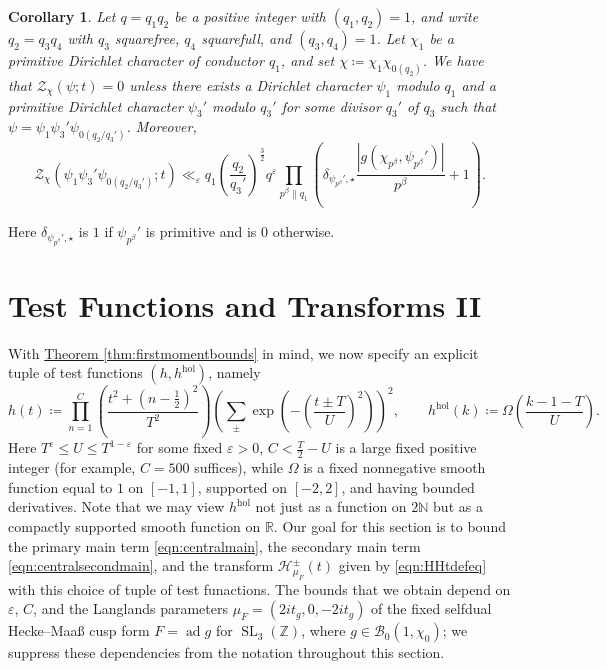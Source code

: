 \documentclass[11pt,a4paper]{amsart}
\newcommand{\BB}{\mathcal{B}}
\newcommand{\e}{\varepsilon}
\newcommand{\HH}{\mathcal{H}}
\newcommand{\hol}{\mathrm{hol}}
\newcommand{\N}{\mathbb{N}}
\newcommand{\R}{\mathbb{R}}
\newcommand{\Z}{\mathbb{Z}}
\newcommand{\ZZ}{\mathcal{Z}}
\DeclareMathOperator{\ad}{ad}
\DeclareMathOperator{\SL}{SL}
\numberwithin{equation}{section}
\newtheorem{corollary}[equation]{Corollary}
\theoremstyle{remark}
\theoremstyle{definition}
\begin{document}
\begin{corollary}
\label{cor:Zbounds}
Let $q = q_1 q_2$ be a positive integer with $(q_1,q_2) = 1$, and write $q_2 = q_3 q_4$ with $q_3$ squarefree, $q_4$ squarefull, and $(q_3,q_4) = 1$. Let $\chi_1$ be a primitive Dirichlet character of conductor $q_1$, and set $\chi \coloneqq \chi_1 \chi_{0(q_2)}$. We have that $\ZZ_{\chi}(\psi;t) = 0$ unless there exists a Dirichlet character $\psi_1$ modulo $q_1$ and a primitive Dirichlet character $\psi_3'$ modulo $q_3'$ for some divisor $q_3'$ of $q_3$ such that $\psi = \psi_1 \psi_3' \psi_{0(q_2/q_3')}$. Moreover,
\[\ZZ_{\chi}\left(\psi_1 \psi_3' \psi_{0(q_2/q_3')};t\right) \ll_{\varepsilon} q_1 \left(\frac{q_2}{q_3'}\right)^{\frac{3}{2}} q^{\e} \prod_{p^{\beta} \parallel q_1} \left(\delta_{\psi_{p^{\beta}}',\star} \frac{|g(\chi_{p^{\beta}},\psi_{p^{\beta}}')|}{p^{\beta}} + 1\right).\]
\end{corollary}

Here $\delta_{\psi_{p^{\beta}}',\star}$ is $1$ if $\psi_{p^{\beta}}'$ is primitive and is $0$ otherwise.


\section{Test Functions and Transforms II}
\label{sect:testfunctionsII}

With \hyperref[thm:firstmomentbounds]{Theorem \ref*{thm:firstmomentbounds}} in mind, we now specify an explicit tuple of test functions $(h,h^{\hol})$, namely
\begin{equation}
\label{eqn:testfunctionchoice}
h(t) \coloneqq \prod_{n = 1}^{C} \left(\frac{t^2 + \left(n - \frac{1}{2}\right)^2}{T^2}\right) \left(\sum_{\pm} \exp\left(-\left(\frac{t \pm T}{U}\right)^2\right)\right)^2, \qquad h^{\hol}(k) \coloneqq \Omega\left(\frac{k - 1 - T}{U}\right).
\end{equation}
Here $T^{\e} \leq U \leq T^{1 - \e}$ for some fixed $\e > 0$, $C < \frac{T}{2} - U$ is a large fixed positive integer (for example, $C = 500$ suffices), while $\Omega$ is a fixed nonnegative smooth function equal to $1$ on $[-1,1]$, supported on $[-2,2]$, and having bounded derivatives. Note that we may view $h^{\hol}$ not just as a function on $2\N$ but as a compactly supported smooth function on $\R$. Our goal for this section is to bound the primary main term \eqref{eqn:centralmain}, the secondary main term \eqref{eqn:centralsecondmain}, and the transform $\HH_{\mu_F}^{\pm}(t)$ given by \eqref{eqn:HHtdefeq} with this choice of tuple of test funactions. The bounds that we obtain depend on $\e$, $C$, and the Langlands parameters $\mu_F = (2it_g,0,-2it_g)$ of the fixed selfdual Hecke--Maa\ss{} cusp form $F = \ad g$ for $\SL_3(\Z)$, where $g \in \BB_0(1,\chi_0)$; we suppress these dependencies from the notation throughout this section.
\end{document}
